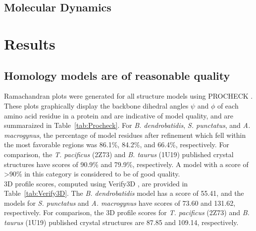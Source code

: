 \subsection{Molecular Dynamics}

\section{Results}
\subsection{Homology models are of reasonable quality}
Ramachandran plots were generated for all structure models using PROCHECK \cite{Laskowski1993,Wiederstein2007}. These plots graphically display the backbone dihedral angles $\psi$ and $\phi$ of each amino acid residue in a protein and are indicative of model quality, and are summaraized in Table~\ref{tab:Procheck}. For \textit{B. dendrobatidis}, \textit{S. punctatus}, and \textit{A. macrogynus}, the percentage of model residues after refinement which fell within the most favorable regions was 86.1\%, 84.2\%, and 66.4\%, respectively. For comparison, the \textit{T. pacificus} (2Z73) and \textit{B. taurus} (1U19) published crystal structures have scores of 90.9\% and 79.9\%, respectively. A model with a score of \textgreater 90\% in this category is considered to be of good quality.\\
\indent 3D profile scores, computed using Verify3D \cite{Luthy1992}, are provided in Table~\ref{tab:Verify3D}. The \textit{B. dendrobatidis} model has a score of 55.41, and the models for \textit{S. punctatus} and \textit{A. macrogynus} have scores of 73.60 and 131.62, respectively. For comparison, the 3D profile scores for \textit{T. pacificus} (2Z73) and \textit{B. taurus} (1U19) published crystal structures are 87.85 and 109.14, respectively.
